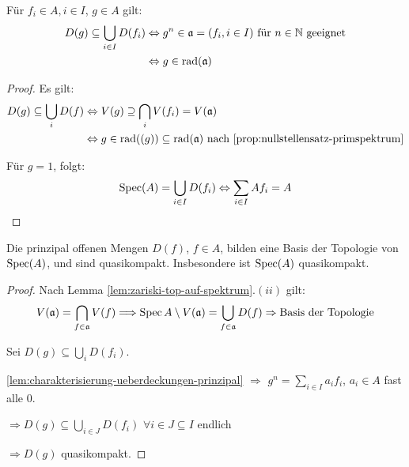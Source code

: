 \begin{lem}
\label{lem:charakterisierung-ueberdeckungen-prinzipal}	
Für $f_{i} \in A, i\in I$, $g\in A$ gilt:
  \begin{align*}
    D(g)\subseteq\bigcup_{i\in I}D(f_{i})
    & \Leftrightarrow g^{n}\in\mathfrak{a}=(f_{i},i\in I)\text{ für }n \in \mathbb{N} \text{ geeignet}\\
    & \Leftrightarrow g\in\operatorname{rad}(\mathfrak{a})
  \end{align*}
\end{lem}
\begin{proof} Es gilt:
  \begin{align*}
    D(g)\subseteq\bigcup_{i}D(f)
    & \Leftrightarrow V(g)\supseteq\bigcap_{i} V(f_{i})=V(\mathfrak{a})\\
    & \Leftrightarrow g\in\operatorname{rad}((g))\subseteq\operatorname{rad}(\mathfrak{a}) \text{ nach } \ref{prop:nullstellensatz-primspektrum}
  \end{align*}

  Für $g=1$, folgt:
  \[ \operatorname{Spec}(A)=\bigcup_{i\in I}D(f_{i})\Leftrightarrow\sum_{i\in
      I}Af_{i}=A
  \]
\end{proof}
\begin{prop}
\label{prop:prinzipal-offene-bilden-basis}
Die prinzipal offenen Mengen $D(f)$, $f\in A$, bilden
  eine Basis der Topologie von $\operatorname{Spec}(A)$, und sind
  quasikompakt. Insbesondere ist $\operatorname{Spec}(A)$ quasikompakt.
\end{prop}
\begin{proof} Nach Lemma \ref{lem:zariski-top-auf-spektrum}$.(ii)$ gilt:
  \[
    V(\mathfrak{a})=\bigcap_{f \in\mathfrak{a}}V(f)\Longrightarrow\operatorname{Spec} A\setminus
    V(\mathfrak{a})=\bigcup_{f\in\mathfrak{a}}D(f)\Rightarrow\text{Basis
      der Topologie}
  \]

  Sei $D(g)\subseteq\bigcup_{i}D(f_{i})$.

  \ref{lem:charakterisierung-ueberdeckungen-prinzipal} $\Rightarrow$ $g^{n}=\sum_{i\in I}a_{i}f_{i}$, $a_{i}\in A$
  fast alle 0.

  $\Rightarrow D(g)\subseteq\bigcup_{i\in J}D(f_{i})$ $\forall i\in J\subseteq I$ endlich

  $\Rightarrow D(g)$ quasikompakt.
\end{proof}
